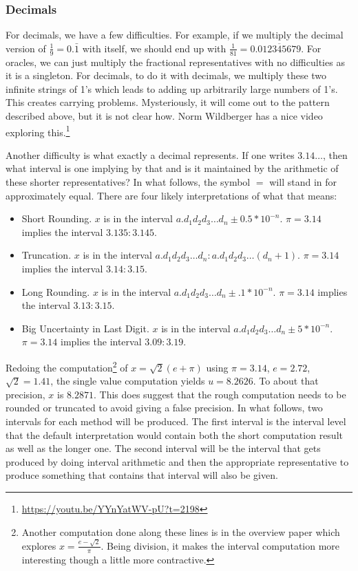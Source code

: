 \documentclass[12pt]{article}
\begin{document}
\subsubsection{Decimals}\label{sec:decimals}

For decimals, we have a few difficulties. For example, if we multiply the decimal version of $\frac{1}{9} = 0.\bar{1}$ with itself, we should end up with $\frac{1}{81} = 0.\overline{012345679}$. For oracles, we can just multiply the fractional representatives with no difficulties as it is a singleton. For decimals, to do it with decimals, we multiply these two infinite strings of 1's which leads to adding up arbitrarily large numbers of 1's. This creates carrying problems. Mysteriously, it will come out to the pattern described above, but it is not clear how. Norm Wildberger has a nice video exploring this.\footnote{\url{https://youtu.be/YYnYatWV-pU?t=2198}}

Another difficulty is what exactly a decimal represents. If one writes $3.14\ldots$, then what interval is one implying by that and is it maintained by the arithmetic of these shorter representatives? In what follows, the symbol $=$ will stand in for approximately equal. There are four likely interpretations of what that means:

\begin{itemize}
\item Short Rounding. $x$ is in the interval $a.d_1d_2d_3\ldots d_n \pm 0.5*10^{-n}$. $\pi = 3.14$ implies the interval $3.135:3.145$.
\item Truncation. $x$ is in the interval $a.d_1d_2d_3\ldots d_n: a.d_1d_2d_3\ldots (d_n+1)$. $\pi=3.14$ implies the interval $3.14:3.15$.
\item Long Rounding. $x$ is in the interval $a.d_1d_2d_3\ldots d_n \pm .1*10^{-n}$. $\pi = 3.14$ implies the interval $3.13:3.15$. 
\item Big Uncertainty in Last Digit. $x$ is in the interval $a.d_1d_2d_3\ldots d_n \pm 5*10^{-n}$. $\pi = 3.14$ implies the interval $3.09:3.19$. 
\end{itemize}

Redoing the computation\footnote{Another computation done along these lines is in the overview paper \cite{taylor23over} which explores $x = \frac{e-\sqrt{2}}{\pi}$. Being division, it makes the interval computation more interesting though a little more contractive.} of $x = \sqrt{2}(e+\pi)$  using $\pi = 3.14$, $e=2.72$, $\sqrt{2} = 1.41$, the single value computation yields $u = 8.2626$. To about that precision, $x$ is $8.2871$. This does suggest that the rough computation needs to be rounded or truncated to avoid giving a false precision. In what follows, two intervals for each method will be produced. The first interval is the interval level that the default interpretation would contain both the short computation result as well as the longer one. The second interval will be the interval that gets produced by doing interval arithmetic and then the appropriate representative to produce something that contains that interval will also be given. 
\end{document}
